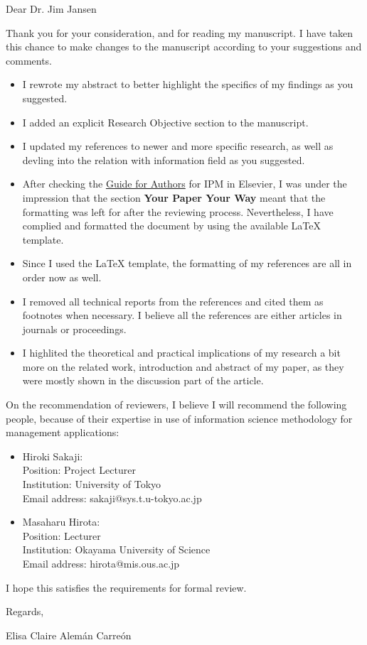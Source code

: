 \documentclass[review]{elsarticle}
\begin{document}
Dear Dr. Jim Jansen

Thank you for your consideration, and for reading my manuscript. I have taken this chance to make changes to the manuscript according to your suggestions and comments. 

\begin{itemize}
\item I rewrote my abstract to better highlight the specifics of my findings as you suggested.
\item I added an explicit Research Objective section to the manuscript.
\item I updated my references to newer and more specific research, as well as devling into the relation with information field as you suggested.
\item After checking the \href{https://www.elsevier.com/journals/information-processing-and-management/0306-4573/guide-for-authors}{Guide for Authors} for IPM in Elsevier, I was under the impression that the section \textbf{Your Paper Your Way} meant that the formatting was left for after the reviewing process. Nevertheless, I have complied and formatted the document by using the available LaTeX template.
\item Since I used the LaTeX template, the formatting of my references are all in order now as well.
\item I removed all technical reports from the references and cited them as footnotes when necessary. I believe all the references are either articles in journals or proceedings.
\item I highlited the theoretical and practical implications of my research a bit more on the related work, introduction and abstract of my paper, as they were mostly shown in the discussion part of the article.
\end{itemize}

On the recommendation of reviewers, I believe I will recommend the following people, because of their expertise in use of information science methodology for management applications:

\begin{itemize}
\item Hiroki Sakaji: \\
    Position: Project Lecturer \\
    Institution: University of Tokyo \\
    Email address: sakaji@sys.t.u-tokyo.ac.jp
\item Masaharu Hirota:  \\
	Position: Lecturer \\
	Institution: Okayama University of Science \\
	Email address: hirota@mis.ous.ac.jp
\end{itemize}


I hope this satisfies the requirements for formal review.

\bigskip\bigskip

Regards,

Elisa Claire Alemán Carreón
\end{document}
